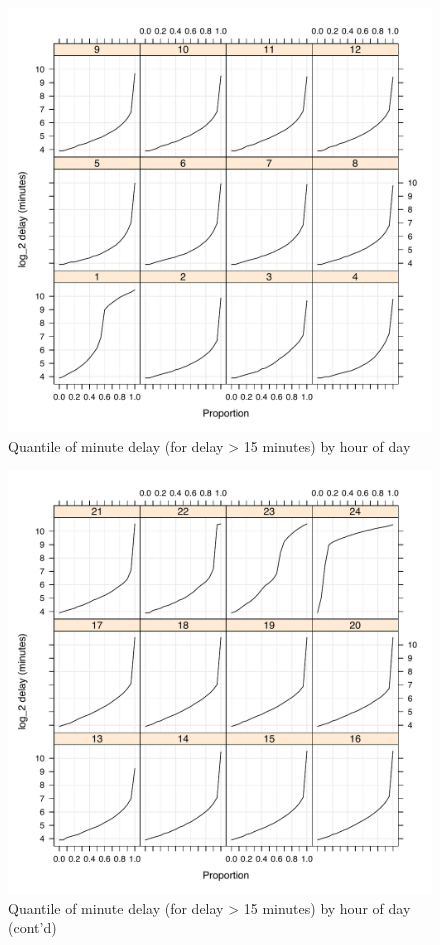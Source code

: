 \documentclass[letterpaper,10pt,english]{sphinxmanual}
\begin{document}
\begin{figure}[htbp]
\centering
\capstart

\includegraphics{quantiles_by_hr_1.pdf}
\caption{Quantile of minute delay (for delay \textgreater{} 15 minutes) by hour of day}\end{figure}
\begin{figure}[htbp]
\centering
\capstart

\includegraphics{quantiles_by_hr_2.pdf}
\caption{Quantile of minute delay (for delay \textgreater{} 15 minutes) by hour of day (cont'd)}\end{figure}
\end{document}
